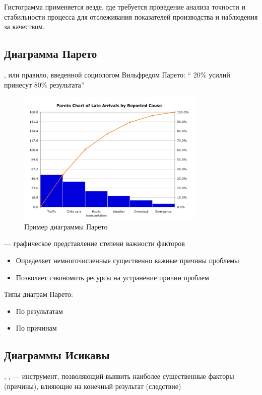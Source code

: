 \documentclass[a4paper, 14pt]{extarticle}
\begin{document}
Гистограмма применяется везде, где требуется проведение анализа точности и стабильности процесса для отслеживания показателей производства и наблюдения за качеством.

\subsection{Диаграмма Парето}
, или  правило, введенной социологом Вильфредом Парето: `` 20\% усилий принесут 80\% результата''

\begin{figure}[h]
    \centering
    \includegraphics[width=0.8\textwidth]{./img/L4/S001.jpg}
    \caption{Пример диаграммы Парето}%
    \label{img:3:1}
\end{figure}

 --- графическое представление степени важности факторов
\begin{itemize}
    \item Определяет немногочисленные существенно важные причины проблемы
    \item Позволяет сэкономить ресурсы на устранение причин проблем
\end{itemize}

Типы диаграм Парето:
\begin{itemize}
    \item По результатам
    \item По причинам
\end{itemize}

\subsection{Диаграммы Исикавы}
, ,  --- инструмент, позволяющий выявить наиболее существенные факторы (причины), влияющие на конечный результат (следствие)
\end{document}

